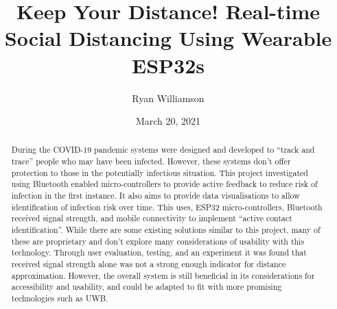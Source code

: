 \documentclass{l4proj}
\begin{document}
\title{Keep Your Distance! Real-time Social Distancing Using Wearable ESP32s}
\author{Ryan Williamson}
\date{March 20, 2021}

\maketitle

\begin{abstract}
    During the COVID-19 pandemic systems were designed and developed to “track and trace” people
    who may have been infected. However, these systems don't offer protection to those in the
    potentially infectious situation. This project investigated using Bluetooth enabled
    micro-controllers to provide active feedback to reduce risk of infection in the first instance.
    It also aims to provide data visualisations to allow identification of infection risk over
    time. This uses, ESP32 micro-controllers, Bluetooth received signal strength, and mobile
    connectivity to implement “active contact identification”. While there are some existing
    solutions similar to this project, many of these are proprietary and don't explore many
    considerations of usability with this technology. Through user evaluation, testing, and an experiment
    it was found that received signal strength alone was not a strong enough indicator for
    distance approximation. However, the overall system is still beneficial in its considerations
    for accessibility and usability, and could be adapted to fit with more promising technologies such
    as UWB.
\end{abstract}


%
%
\def\consentname {Ryan Williamson} %
\def\consentdate {20 March 2021} %
%
\educationalconsent
\end{document}
